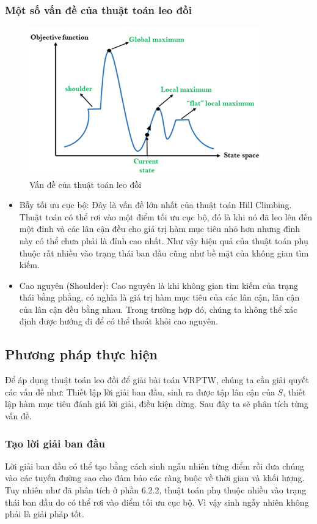 \documentclass[12pt,a4paper]{article}\author{Nguyễn Nho Dũng}
\begin{document}
\subsubsection{Một số vấn đề của thuật toán leo đồi }
\begin{figure}[H]
	\centering
	\includegraphics[width=0.9\textwidth]{Anh/mo_ta_leo_doi}
	\caption{Vấn đề của thuật toán leo đồi}
\end{figure}
\begin{itemize}
	\item Bẫy tối ưu cục bộ: Đây là vấn đề lớn nhất của thuật toán Hill Climbing. Thuật toán có thể rơi vào một điểm tối ưu cục bộ, đó là khi nó đã leo lên đến một đỉnh và các lân cận đều cho giá trị hàm mục tiêu nhỏ hơn nhưng đỉnh này có thể chưa phải là đỉnh cao nhất. Như vậy hiệu quả của thuật toán phụ thuộc rất nhiều vào trạng thái ban đầu cũng như bề mặt của không gian tìm kiếm.
	\item Cao nguyên (Shoulder): Cao nguyên  là khi không gian tìm kiếm của trạng thái bằng phẳng, có nghĩa là giá trị hàm mục tiêu của các lân cận, lân cận của lân cận đều bằng nhau. Trong trường hợp đó, chúng ta không thể xác định được hướng đi để có thể thoát khỏi cao nguyên.
\end{itemize}
\subsection{Phương pháp thực hiện}
Để áp dụng thuật toán leo đồi để giải bài toán VRPTW, chúng ta cần giải quyết các vấn đề như: Thiết lập lời giải ban đầu, sinh ra được tập lân cận của $S$, thiết lập hàm mục tiêu đánh giá lời giải, điều kiện dừng. Sau đây ta sẽ phân tích từng vấn đề.
\subsubsection{Tạo lời giải ban đầu}
Lời giải ban đầu có thể tạo bằng cách sinh ngẫu nhiên từng điểm rồi đưa chúng vào các tuyến đường sao cho đảm bảo các ràng buộc về thời gian và khối lượng. Tuy nhiên như đã phân tích ở phần 6.2.2, thuật toán phụ thuộc nhiều vào trạng thái ban đầu do có thể rơi vào điểm tối ưu cục bộ. Vì vậy sinh ngẫy nhiên không phải là giải pháp tốt.\\
\end{document}
